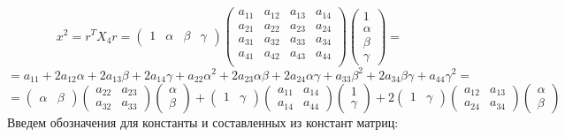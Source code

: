 \documentclass[pdftex,ptm,12pt,a4paper]{report}
\begin{document}
    \[
      x^2 = r^T X_4 r = 
        \begin{pmatrix} 1 & \alpha & \beta & \gamma \end{pmatrix} 
        \begin{pmatrix} 
              a_{11} & a_{12} & a_{13} & a_{14} \\ 
              a_{21} & a_{22} & a_{23} & a_{24} \\ 
              a_{31} & a_{32} & a_{33} & a_{34} \\
              a_{41} & a_{42} & a_{43} & a_{44} \\

        \end{pmatrix}
        \begin{pmatrix} 1 \\ \alpha \\ \beta \\ \gamma \end{pmatrix}  = 
    \]\[
        = a_{11} + 2a_{12}\alpha + 2a_{13}\beta + 2a_{14}\gamma + 
                 a_{22}\alpha^2 + 2a_{23}\alpha\beta + 2a_{24}\alpha\gamma + 
                                  a_{33}\beta^2 + 2a_{34}\beta\gamma + 
                                                  a_{44}\gamma^2  = 
    \]\[
        = \begin{pmatrix} \alpha & \beta \end{pmatrix} 
          \begin{pmatrix} 
              a_{22} & a_{23} \\ 
              a_{32} & a_{33} 
        \end{pmatrix}
        \begin{pmatrix} \alpha \\ \beta \end{pmatrix} 
      + \begin{pmatrix} 1 & \gamma \end{pmatrix} 
          \begin{pmatrix} 
              a_{11} & a_{14} \\ 
              a_{14} & a_{44} 
        \end{pmatrix}
        \begin{pmatrix} 1 \\ \gamma \end{pmatrix}         
      + 2\begin{pmatrix} 1 & \gamma \end{pmatrix} 
          \begin{pmatrix} 
              a_{12} & a_{13} \\ 
              a_{24} & a_{34} 
        \end{pmatrix}
        \begin{pmatrix} \alpha \\ \beta \end{pmatrix} 
    \] 
    Введем обозначения для константы и составленных из констант матриц: 
\end{document}
